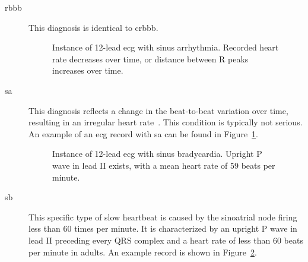 \documentclass[\main/thesis.tex]{subfiles}
\begin{document}
\begin{description}
    \item[\gls{rbbb}] This diagnosis is identical to \gls{crbbb}.

    \begin{figure}[ht]
        \centering
        \caption{Instance of 12-lead \gls{ecg} with sinus arrhythmia. Recorded heart rate decreases over time, or distance between R peaks increases over time.}
        \label{fig:full_SA}
    \end{figure}
    \item[\gls{sa}] This diagnosis reflects a change in the beat-to-beat variation over time, resulting in an irregular heart rate~\cite{surawicz_borys_ahaaccfhrs_2009}.
    This condition is typically not serious.
    An example of an \gls{ecg} record with \gls{sa} can be found in Figure~\ref{fig:full_SA}.

    \begin{figure}[ht]
        \centering
        \caption{Instance of 12-lead \gls{ecg} with sinus bradycardia. Upright P wave in lead II exists, with a mean heart rate of 59 beats per minute.}
        \label{fig:full_SB}
    \end{figure}
    \item[\gls{sb}] This specific type of slow heartbeat is caused by the sinoatrial node firing less than 60 times per minute.
    It is characterized by an upright P wave in lead II preceding every QRS complex and a heart rate of less than 60 beats per minute in adults.
    An example record is shown in Figure~\ref{fig:full_SB}.


\end{description}
\end{document}

